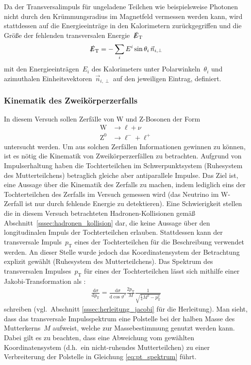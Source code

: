 \documentclass[11pt, a4paper]{article}
\numberwithin{equation}{section}
\begin{document}
Da der Transversalimpuls für ungeladene Teilchen wie beispielsweise Photonen nicht durch den Krümmungsradius im Magnetfeld vermessen werden kann, wird stattdessen auf die Energieeinträge in den Kalorimetern zurückgegriffen und die Größe der fehlenden transversalen Energie~$\slashed{E}_\mathrm{T}$ \cite{script}
\begin{align*}
	\slashed{E}_\mathrm{T} = - \sum_{i} E^i \sin\theta_i \, \vec{n}_{i,\perp}
\end{align*}
mit den Energieeinträgen~$E_i$ des Kalorimeters unter Polarwinkeln~$\theta_i$  und azimuthalen Einheitsvektoren~$\vec{n}_{i,\perp}$ auf den jeweiligen Eintrag, definiert.

\subsubsection{Kinematik des Zweikörperzerfalls}
\label{sssec:kinamtik_zweikoerperzerfall}
In diesem Versuch sollen Zerfälle von W und Z-Bosonen der Form 
\begin{align*}
	\mathrm{W} &\rightarrow \ell + \nu \\
	\mathrm{Z}^0 &\rightarrow \ell^- + \ell^+
\end{align*}
untersucht werden.
Um aus solchen Zerfällen Informationen gewinnen zu können, ist es nötig die Kinematik von Zweikörperzerfällen zu betrachten.
Aufgrund von Impulserhaltung haben die Tochterteilchen im Schwerpunktsystem (Ruhesystem des Mutterteilchens) betraglich gleiche aber antiparallele Impulse.
Das Ziel ist, eine Aussage über die Kinematik des Zerfalls zu machen, indem lediglich eins der Tochterteilchen des Zerfalls im Versuch gemessen wird (das Neutrino im W-Zerfall ist nur durch fehlende Energie zu detektieren).
Eine Schwierigkeit stellen die in diesem Versuch betrachteten Hadronen-Kollisionen gemäß Abschnitt~\ref{sssec:hadronen_kollision} dar, die keine Aussage über den longitudinalen Impuls der Tochterteilchen erlauben.
Stattdessen kann der transversale Impuls~$p_\mathrm{T}$ eines der Tochterteilchen für die Beschreibung verwendet werden.
An dieser Stelle wurde jedoch das Koordinatensystem der Betrachtung explizit gewählt (Ruhesystem des Mutterteilchens).
Das Spektrum des transversalen Impulses~$p_\mathrm{T}$ für eines der Tochterteilchen lässt sich mithilfe einer Jakobi-Transformation als \cite{script}:
\begin{align}
	\label{eq:pt_spektrum}
	\frac{\mathrm{d} \sigma}{\mathrm{d}p_\mathrm{T}} = \frac{\mathrm{d}\sigma}{\mathrm{d}\cos\vartheta^*} \frac{2 p_\mathrm{T}}{M} \frac{1}{\sqrt{\frac{1}{4} M^2 - p_\mathrm{T}^2}}
\end{align}
schreiben (vgl.\ Abschnitt \ref{sssec:herleitung_jacobi} für die Herleitung).
Man sieht, dass das transversale Impulsspektrum eine Polstelle bei der halben Masse des Mutterkerns~$M$ aufweist, welche zur Massebestimmung genutzt werden kann.
Dabei gilt es zu beachten, dass eine Abweichung vom gewählten Koordinatensystem (d.h.\ ein nicht-ruhendes Mutterteilchen) zu einer Verbreiterung der Polstelle in Gleichung \eqref{eq:pt_spektrum} führt.
\end{document}
